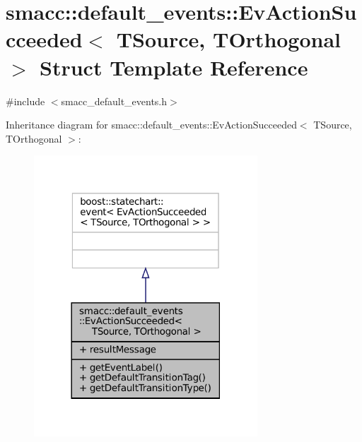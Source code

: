 \hypertarget{structsmacc_1_1default__events_1_1EvActionSucceeded}{}\section{smacc\+:\+:default\+\_\+events\+:\+:Ev\+Action\+Succeeded$<$ T\+Source, T\+Orthogonal $>$ Struct Template Reference}
\label{structsmacc_1_1default__events_1_1EvActionSucceeded}


{\ttfamily \#include $<$smacc\+\_\+default\+\_\+events.\+h$>$}



Inheritance diagram for smacc\+:\+:default\+\_\+events\+:\+:Ev\+Action\+Succeeded$<$ T\+Source, T\+Orthogonal $>$\+:
\nopagebreak
\begin{figure}[H]
\begin{center}
\leavevmode
\includegraphics[width=237pt]{structsmacc_1_1default__events_1_1EvActionSucceeded__inherit__graph}
\end{center}
\end{figure}


